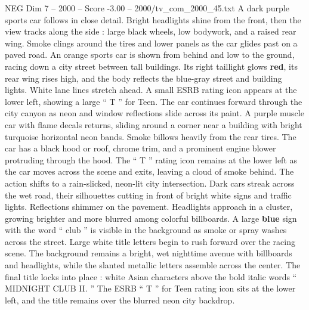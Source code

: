 \begin{textsample}{NEG Dim 7 – 2000 – Score -3.00 – 2000/tv\_com\_2000\_45.txt}
A dark purple sports car follows in close detail.
Bright headlights shine from the front, then the view tracks along the side : large black wheels, low bodywork, and a raised rear wing.
Smoke clings around the tires and lower panels as the car glides past on a paved road.
An orange sports car is shown from behind and low to the ground, racing down a city street between tall buildings.
Its right taillight glows \textbf{red}, its rear wing rises high, and the body reflects the blue-gray street and building lights.
White lane lines stretch ahead.
A small ESRB rating icon appears at the lower left, showing a large “ T ” for Teen.
The car continues forward through the city canyon as neon and window reflections slide across its paint.
A purple muscle car with flame decals returns, sliding around a corner near a building with bright turquoise horizontal neon bands.
Smoke billows heavily from the rear tires.
The car has a black hood or roof, chrome trim, and a prominent engine blower protruding through the hood.
The “ T ” rating icon remains at the lower left as the car moves across the scene and exits, leaving a cloud of smoke behind.
The action shifts to a rain-slicked, neon-lit city intersection.
Dark cars streak across the wet road, their silhouettes cutting in front of bright white signs and traffic lights.
Reflections shimmer on the pavement.
Headlights approach in a cluster, growing brighter and more blurred among colorful billboards.
A large \textbf{blue} sign with the word “ club ” is visible in the background as smoke or spray washes across the street.
Large white title letters begin to rush forward over the racing scene.
The background remains a bright, wet nighttime avenue with billboards and headlights, while the slanted metallic letters assemble across the center.
The final title locks into place : white Asian characters above the bold italic words “ MIDNIGHT CLUB II. ” The ESRB “ T ” for Teen rating icon sits at the lower left, and the title remains over the blurred neon city backdrop.

\end{textsample}
